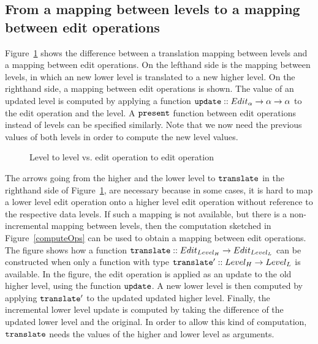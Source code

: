 \subsection{From a mapping between levels to a mapping between edit operations}

Figure~\ref{fromLevelToOp} shows the difference between a translation mapping between levels and a mapping between edit operations. On the lefthand side is the mapping between levels, in which an new lower level is translated to a new higher level. On the righthand side, a mapping between edit operations is shown. The value of an updated level is computed by applying a function
 ${\tt update} :: Edit_\alpha \rightarrow \alpha \rightarrow \alpha$ to the edit operation and the level. A 
 ${\tt present}$ function between edit operations instead of levels can be specified similarly.  Note that we now need the previous values of both levels in order to compute the new level values.
 

\begin{figure}
\begin{small}
\begin{center}
\begin{center}
\end{center}\caption{Level to level vs. edit operation to edit operation }\label{fromLevelToOp} 
\end{center}
\end{small}
\end{figure}


The arrows going from the higher and the lower level to ${\tt translate}$ in the righthand side of Figure~\ref{fromLevelToOp}, are necessary because in some cases, it is hard to map a lower level edit operation onto a higher level edit operation without reference to the respective data levels. If such a mapping is not available, but there is a non-incremental mapping between levels, then the computation sketched in Figure~\ref{computeOps} can be used to obtain a mapping between edit operations. The figure shows how a function ${\tt translate} :: Edit_{Level_{H}} \rightarrow Edit_{Level_{L}}$ can be constructed when only a function with type ${\tt translate'} :: Level_{H} \rightarrow Level_{L}$  is available. In the figure, the edit operation is applied as an update to the old higher level, using the function ${\tt update}$. A new lower level is then computed by applying ${\tt translate'}$ to the updated updated higher level. Finally, the incremental lower level update is computed by taking the difference of the updated lower level and the original. In order to allow this kind of computation, ${\tt translate}$ needs the values of the higher and lower level as arguments.

